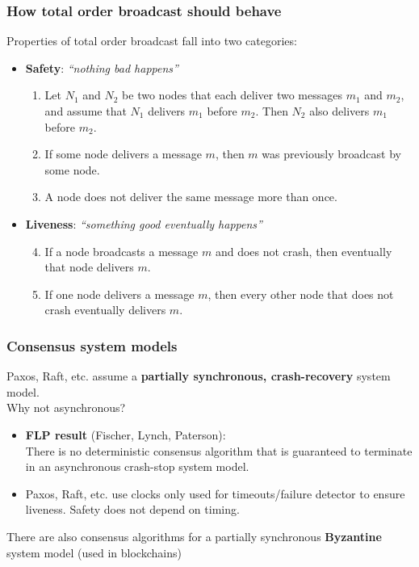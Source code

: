 \begin{frame}
    \label{s:safety-liveness}
    \frametitle{How total order broadcast should behave}
    Properties of total order broadcast fall into two categories:
    \begin{itemize}
        \item \textbf{Safety}: \emph{``nothing bad happens''}\\
            \begin{enumerate}
                \item<2-> Let $N_1$ and $N_2$ be two nodes that each deliver two messages $m_1$ and $m_2$, and assume that $N_1$ delivers $m_1$ before $m_2$.
                    Then $N_2$ also delivers $m_1$ before $m_2$.
                \item<3-> If some node delivers a message $m$, then $m$ was previously broadcast by some node.
                \item<4-> A node does not deliver the same message more than once.
            \end{enumerate}
        \item \textbf{Liveness}: \emph{``something good eventually happens''}
            \begin{enumerate}
                \setcounter{enumi}{3}
                \item<5-> If a node broadcasts a message $m$ and does not crash, then eventually that node delivers $m$.
                \item<6-> If one node delivers a message $m$, then every other node that does not crash eventually delivers $m$.
            \end{enumerate}
    \end{itemize}
\end{frame}
\label{l:safety-liveness}

\begin{frame}
    \label{s:consensus-model}
    \frametitle{Consensus system models}
    Paxos, Raft, etc. assume a \textbf{partially synchronous, crash-recovery} system model.\\[1em]\pause
    Why not asynchronous?
    \begin{itemize}
        \item \textbf{FLP result} (Fischer, Lynch, Paterson):\\
            There is no deterministic consensus algorithm that is guaranteed to terminate in an asynchronous crash-stop system model.\pause
        \item Paxos, Raft, etc. use clocks only used for timeouts/failure detector to ensure liveness.
            Safety does not depend on timing.\\[1em]\pause
    \end{itemize}
    There are also consensus algorithms for a partially synchronous \textbf{Byzantine} system model (used in blockchains)
\end{frame}
\label{l:consensus-model}

